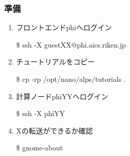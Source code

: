 \begin{frame}[fragile]
  \frametitle{準備}
  \begin{enumerate}
  \item<1-> フロントエンドphiへログイン
\begin{semiverbatim}
\$ ssh -X guest{\color{red}XX}@phi.aics.riken.jp
\end{semiverbatim}
  \item<2-> チュートリアルをコピー
\begin{semiverbatim}
\$ cp -rp /opt/nano/alps/tutorials .
\end{semiverbatim}
  \item<3-> 計算ノードphi{\color{red}YY}へログイン
\begin{semiverbatim}
\$ ssh -X phi{\color{red}YY}
\end{semiverbatim}
  \item<4-> Xの転送ができるか確認
\begin{semiverbatim}
\$ gnome-about
\end{semiverbatim}
  \end{enumerate}
\end{frame}

